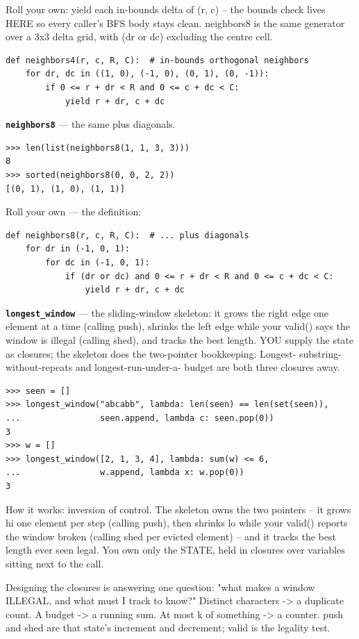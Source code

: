 \documentclass[10pt,letterpaper]{article}
\begin{document}
Roll your own: yield each in-bounds delta of (r, c) -- the bounds check lives HERE so every caller's BFS body stays clean. neighbors8 is the same generator over a 3x3 delta grid, with (dr or dc) excluding the centre cell.

\begin{lstlisting}[style=ex]
def neighbors4(r, c, R, C):  # in-bounds orthogonal neighbors
    for dr, dc in ((1, 0), (-1, 0), (0, 1), (0, -1)):
        if 0 <= r + dr < R and 0 <= c + dc < C:
            yield r + dr, c + dc
\end{lstlisting}
\textbf{\texttt{neighbors8}} --- the same plus diagonals.
\begin{lstlisting}[style=ex]
>>> len(list(neighbors8(1, 1, 3, 3)))
8
>>> sorted(neighbors8(0, 0, 2, 2))
[(0, 1), (1, 0), (1, 1)]
\end{lstlisting}

Roll your own --- the definition:

\begin{lstlisting}[style=ex]
def neighbors8(r, c, R, C):  # ... plus diagonals
    for dr in (-1, 0, 1):
        for dc in (-1, 0, 1):
            if (dr or dc) and 0 <= r + dr < R and 0 <= c + dc < C:
                yield r + dr, c + dc
\end{lstlisting}
\textbf{\texttt{longest\_window}} --- the sliding-window skeleton: it grows the right edge one element at a time (calling push), shrinks the left edge while your valid() says the window is illegal (calling shed), and tracks the best length. YOU supply the state as closures; the skeleton does the two-pointer bookkeeping. Longest- substring-without-repeats and longest-run-under-a- budget are both three closures away.
\begin{lstlisting}[style=ex]
>>> seen = []
>>> longest_window("abcabb", lambda: len(seen) == len(set(seen)),
...                seen.append, lambda c: seen.pop(0))
3
>>> w = []
>>> longest_window([2, 1, 3, 4], lambda: sum(w) <= 6,
...                w.append, lambda x: w.pop(0))
3
\end{lstlisting}

How it works: inversion of control. The skeleton owns the two pointers -- it grows hi one element per step (calling push), then shrinks lo while your valid() reports the window broken (calling shed per evicted element) -- and it tracks the best length ever seen legal. You own only the STATE, held in closures over variables sitting next to the call.


Designing the closures is answering one question: "what makes a window ILLEGAL, and what must I track to know?" Distinct characters -> a duplicate count. A budget -> a running sum. At most k of something -> a counter. push and shed are that state's increment and decrement; valid is the legality test.
\end{document}
